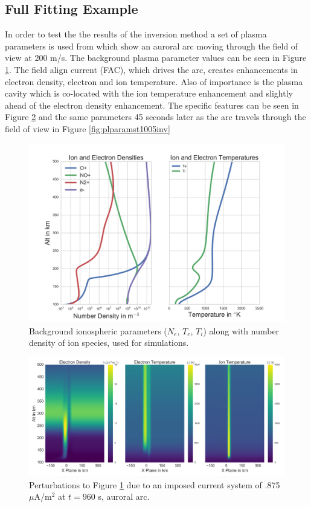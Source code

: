 \subsection{Full Fitting Example}

In order to test the the results of the inversion method a set of plasma parameters is used from \citet{Perry:2015jf} which show an auroral arc moving through the field of view at 200 m/s. The background plasma parameter values can be seen in Figure \ref{fig:plparamst0inv}. The field align current (FAC), which drives the arc, creates enhancements in electron density, electron and ion temperature. Also of importance is the plasma cavity which is co-located with the ion temperature enhancement and slightly ahead of the electron density enhancement. The specific features can be seen in Figure \ref{fig:plparamst960inv} and the same parameters 45 seconds later as the arc travels through the field of view in Figure \ref{fig:plparamst1005inv}

\begin{figure}[!ht]
\centering
\includegraphics[width=6in]{backgroundallparams}
\caption{Background ionospheric parameters ($N_e$, $T_e$, $T_i$) along with number density of ion species, used for simulations.}
\label{fig:plparamst0inv}
\end{figure}

\begin{figure}[!ht]
\centering
\includegraphics[width=6in]{0960_15_int}
\caption{Perturbations to Figure \ref{fig:plparamst0inv} due to an imposed current system of .875 $\mu$A/m$^2$ at $t=960$ s, auroral arc.}
\label{fig:plparamst960inv}
\end{figure}


